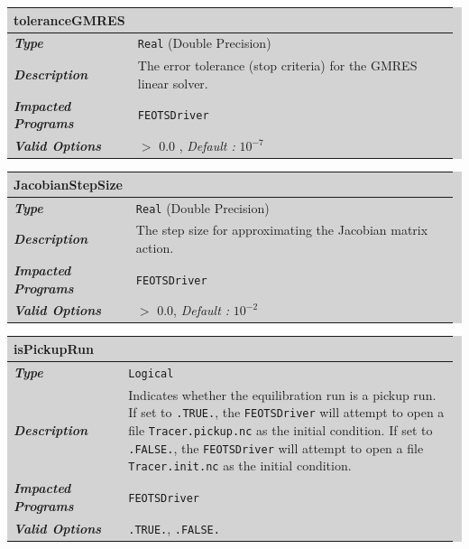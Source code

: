 \documentclass{softwaremanual}
\begin{document}
\noindent\begingroup\setlength{\fboxsep}{0pt}
\colorbox{lightgray}{
\begin{tabular}{p{0.25\linewidth} p{0.725\linewidth}}
\toprule
\textbf{toleranceGMRES} & \\
\midrule
\textbf{\textit{Type}} & \texttt{Real} (Double Precision) \\
\midrule
\textbf{\textit{Description}} & The error tolerance (stop criteria) for the GMRES linear solver. \\
\midrule
\textbf{\textit{Impacted Programs}} & \texttt{FEOTSDriver} \\
\midrule
\textbf{\textit{Valid Options}}  & $>$ 0.0 , \textit{Default :} $10^{-7}$\\
\bottomrule
\end{tabular}
}\endgroup


\noindent\begingroup\setlength{\fboxsep}{0pt}
\colorbox{lightgray}{
\begin{tabular}{p{0.25\linewidth} p{0.725\linewidth}}
\toprule
\textbf{JacobianStepSize} & \\
\midrule
\textbf{\textit{Type}} & \texttt{Real} (Double Precision) \\
\midrule
\textbf{\textit{Description}} & The step size for approximating the Jacobian matrix action. \\
\midrule
\textbf{\textit{Impacted Programs}} & \texttt{FEOTSDriver} \\
\midrule
\textbf{\textit{Valid Options}}  & $>$ 0.0, \textit{Default :} $10^{-2}$\\
\bottomrule
\end{tabular}
}\endgroup

\noindent\begingroup\setlength{\fboxsep}{0pt}
\colorbox{lightgray}{
\begin{tabular}{p{0.25\linewidth} p{0.725\linewidth}}
\toprule
\textbf{isPickupRun} & \\
\midrule
\textbf{\textit{Type}} & \texttt{Logical} \\
\midrule
\textbf{\textit{Description}} & Indicates whether the equilibration run is a pickup run. If set to \texttt{.TRUE.}, the \texttt{FEOTSDriver} will attempt to open a file \texttt{Tracer.pickup.nc} as the initial condition. If set to \texttt{.FALSE.}, the \texttt{FEOTSDriver} will attempt to open a file \texttt{Tracer.init.nc} as the initial condition. \\
\midrule
\textbf{\textit{Impacted Programs}} & \texttt{FEOTSDriver} \\
\midrule
\textbf{\textit{Valid Options}}  & \texttt{.TRUE.}, \texttt{.FALSE.} \\
\bottomrule
\end{tabular}
}\endgroup
\end{document}
